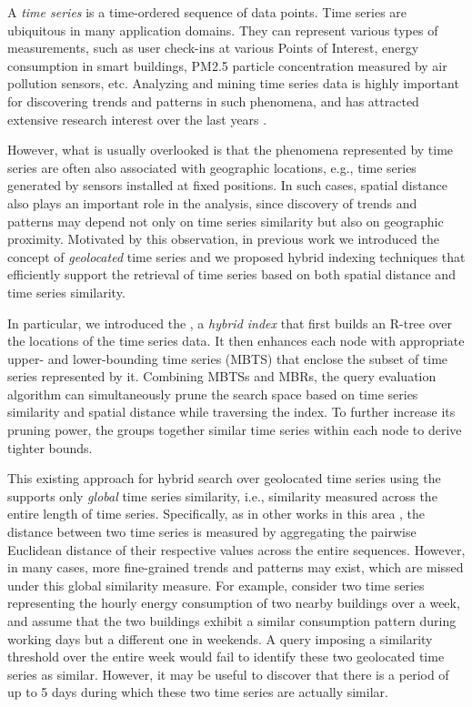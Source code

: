 A {\em time series} is a time-ordered sequence of data points. Time series are ubiquitous in many application domains. They can represent various types of measurements, such as user check-ins at various Points of Interest, energy consumption in smart buildings, PM2.5 particle concentration measured by air pollution sensors, etc. Analyzing and mining time series data is highly important for discovering trends and patterns in such phenomena, and has attracted extensive research interest over the last years \cite{DBLP:journals/pvldb/EchihabiZPB18,DBLP:conf/sigmod/LinardiZPK18a,DBLP:journals/datamine/YehZUBDDZSMK18}.

However, what is usually overlooked is that the phenomena represented by time series are often also associated with geographic locations, e.g., time series generated by sensors installed at fixed positions. In such cases, spatial distance also plays an important role in the analysis, since discovery of trends and patterns may depend not only on time series similarity but also on geographic proximity. Motivated by this observation, in previous work \cite{chatzig17btsr, DBLP:conf/gis/Chatzigeorgakidis18} we introduced the concept of {\em geolocated} time series and we  proposed hybrid indexing techniques that efficiently support the retrieval of time series based on both spatial distance and time series similarity.

In particular, we introduced the \btsr \cite{chatzig17btsr}, a {\em hybrid index} that first builds an R-tree over the locations of the time series data. It then enhances each node with appropriate upper- and lower-bounding time series (MBTS) that enclose the subset of time series represented by it. Combining MBTSs and MBRs, the query evaluation algorithm can simultaneously prune the search space based on time series similarity and spatial distance while traversing the index. To further increase its pruning power, the \btsr groups together similar time series within each node to derive tighter bounds.

This existing approach for hybrid search over geolocated time series using the \btsr supports only {\em global} time series similarity, i.e., similarity measured across the entire length of time series. Specifically, as in other works in this area \cite{DBLP:journals/pvldb/EchihabiZPB18,jessica2007dmkd,camerra2010icdm,camerra2014kais}, the distance between two time series is measured by aggregating the pairwise Euclidean distance of their respective values across the entire sequences. However, in many cases, more fine-grained trends and patterns may exist, which are missed under this global similarity measure. For example, consider two time series representing the hourly energy consumption of two nearby buildings over a week, and assume that the two buildings exhibit a similar consumption pattern during working days but a different one in weekends. A query imposing a similarity threshold over the entire week would fail to identify these two geolocated time series as similar. However, it may be useful to discover that there is a period of up to 5 days during which these two time series are actually similar.

